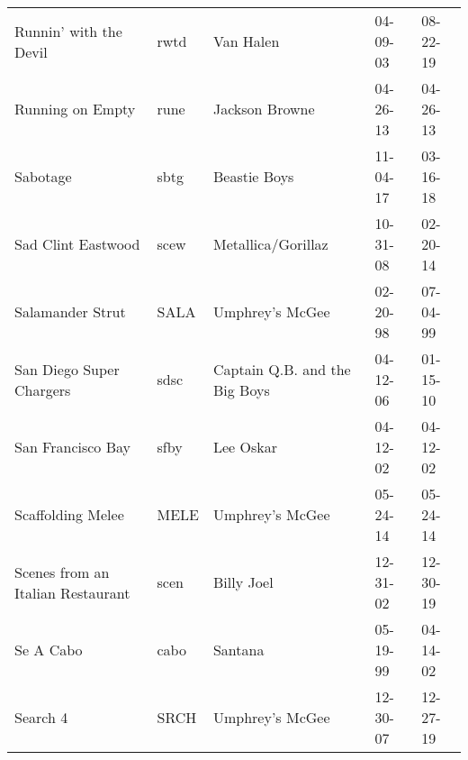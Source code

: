 \begin{longtable}{p{}p{}p{}p{}p{}}
                                                  Runnin' with the Devil &          rwtd &                                                Van Halen &              04-09-03 &             08-22-19 \\
                                                        Running on Empty &          rune &                                           Jackson Browne &              04-26-13 &             04-26-13 \\
                                                                Sabotage &          sbtg &                                             Beastie Boys &              11-04-17 &             03-16-18 \\
                                                      Sad Clint Eastwood &          scew &                                       Metallica/Gorillaz &              10-31-08 &             02-20-14 \\
                                                        Salamander Strut &          SALA &                                          Umphrey's McGee &              02-20-98 &             07-04-99 \\
                                                San Diego Super Chargers &          sdsc &                            Captain Q.B. and the Big Boys &              04-12-06 &             01-15-10 \\
                                                       San Francisco Bay &          sfby &                                                Lee Oskar &              04-12-02 &             04-12-02 \\
                                                       Scaffolding Melee &          MELE &                                          Umphrey's McGee &              05-24-14 &             05-24-14 \\
                                       Scenes from an Italian Restaurant &          scen &                                               Billy Joel &              12-31-02 &             12-30-19 \\
                                                               Se A Cabo &          cabo &                                                  Santana &              05-19-99 &             04-14-02 \\
                                                                Search 4 &          SRCH &                                          Umphrey's McGee &              12-30-07 &             12-27-19 \\

\end{longtable}
